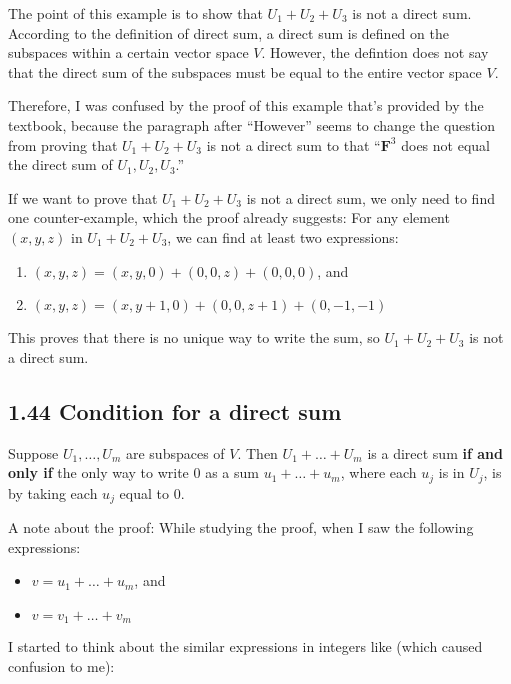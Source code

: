 \documentclass[12pt, letterpaper, oneside]{book}
\begin{document}
The point of this example is to show that $U_1 + U_2 + U_3$ is not a direct
sum. According to the definition of direct sum, a direct sum is defined on the
subspaces within a certain vector space $V$. However, the defintion does not
say that the direct sum of the subspaces must be equal to the entire vector
space $V$.

Therefore, I was confused by the proof of this example that's provided by the
textbook, because the paragraph after ``However'' seems to change the question
from proving that $U_1 + U_2 + U_3$ is not a direct sum to that
``$\mathbf{F}^3$ does not equal the direct sum of $U_1, U_2, U_3$.''

If we want to prove that $U_1 + U_2 + U_3$ is not a direct sum, we only need to
find one counter-example, which the proof already suggests: For any element
$(x, y, z)$ in $U_1 + U_2 + U_3$, we can find at least two expressions:

\begin{enumerate}
  \item $(x, y, z) = (x, y, 0) + (0, 0, z) + (0, 0, 0)$, and
  \item $(x, y, z) = (x, y + 1, 0) + (0, 0, z + 1) + (0, -1, -1)$
\end{enumerate}

This proves that there is no unique way to write the sum, so $U_1 + U_2 + U_3$
is not a direct sum.

\subsection{1.44 Condition for a direct sum}

Suppose $U_1, \ldots, U_m$ are subspaces of $V$. Then $U_1 + \ldots + U_m$ is a
direct sum \textbf{if and only if} the only way to write $0$ as a sum $u_1 +
\ldots + u_m$, where each $u_j$ is in $U_j$, is by taking each $u_j$ equal to 0.

A note about the proof: While studying the proof, when I saw the following
expressions:

\begin{itemize}
  \item $v = u_1 + \ldots + u_m$, and
  \item $v = v_1 + \ldots + v_m$
\end{itemize}

I started to think about the similar expressions in integers like (which caused
confusion to me):
\end{document}
